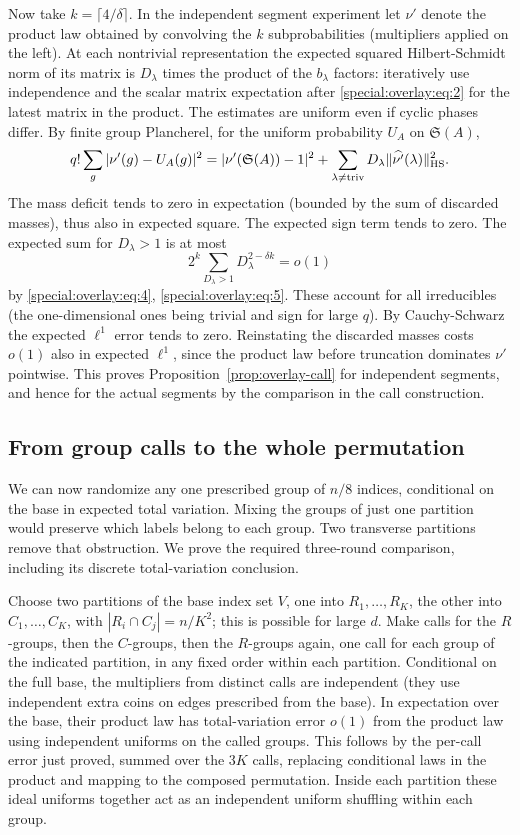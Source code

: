 Now take \(k=\lceil 4/\delta\rceil\). In the independent segment experiment let \(\nu'\) denote the product law obtained by convolving the \(k\) subprobabilities (multipliers applied on the left). At each nontrivial representation the expected squared Hilbert-Schmidt norm of its matrix is \(D_\lambda\) times the product of the \(b_\lambda\) factors: iteratively use independence and the scalar matrix expectation after \eqref{special:overlay:eq:2} for the latest matrix in the product. The estimates are uniform even if cyclic phases differ. By finite group Plancherel, for the uniform probability \(U_A\) on \(\mathfrak S(A)\),
\[
 q!\sum_g |\nu'(g)-U_A(g)|^2
    = |\nu'(\mathfrak S(A))-1|^2+
      \sum_{\lambda\ne{\rm triv}}D_\lambda
             \|\widehat{\nu'}(\lambda)\|_{\rm HS}^2 .
\]
The mass deficit tends to zero in expectation (bounded by the sum of discarded masses), thus also in expected square. The expected sign term tends to zero. The expected sum for \(D_\lambda>1\) is at most
\[
 2^k \sum_{D_\lambda>1} D_\lambda^{2-\delta k}=o(1)
\]
by \eqref{special:overlay:eq:4}, \eqref{special:overlay:eq:5}. These account for all irreducibles (the one-dimensional ones being trivial and sign for large \(q\)). By Cauchy-Schwarz the expected \(\ell^1\) error tends to zero. Reinstating the discarded masses costs \(o(1)\) also in expected \(\ell^1\), since the product law before truncation dominates \(\nu'\) pointwise. This proves Proposition~\ref{prop:overlay-call} for independent segments, and hence for the actual segments by the comparison in the call construction.

\subsection{From group calls to the whole permutation}

We can now randomize any one prescribed group of $n/8$ indices, conditional on the base in expected total variation. Mixing the groups of just one partition would preserve which labels belong to each group. Two transverse partitions remove that obstruction. We prove the required three-round comparison, including its discrete total-variation conclusion.

Choose two partitions of the base index set \(V\), one into \(R_1,\ldots,R_K\), the other into \(C_1,\ldots,C_K\), with \(|R_i\cap C_j|=n/K^2\); this is possible for large \(d\). Make calls for the \(R\)-groups, then the \(C\)-groups, then the \(R\)-groups again, one call for each group of the indicated partition, in any fixed order within each partition. Conditional on the full base, the multipliers from distinct calls are independent (they use independent extra coins on edges prescribed from the base). In expectation over the base, their product law has total-variation error \(o(1)\) from the product law using independent uniforms on the called groups. This follows by the per-call error just proved, summed over the \(3K\) calls, replacing conditional laws in the product and mapping to the composed permutation. Inside each partition these ideal uniforms together act as an independent uniform shuffling within each group.

